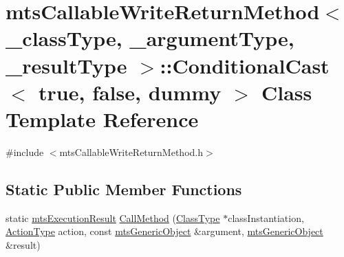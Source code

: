 \hypertarget{classmts_callable_write_return_method_1_1_conditional_cast_3_01true_00_01false_00_01dummy_01_4}{\section{mts\-Callable\-Write\-Return\-Method$<$ \-\_\-class\-Type, \-\_\-argument\-Type, \-\_\-result\-Type $>$\-:\-:Conditional\-Cast$<$ true, false, dummy $>$ Class Template Reference}
\label{classmts_callable_write_return_method_1_1_conditional_cast_3_01true_00_01false_00_01dummy_01_4}
}


{\ttfamily \#include $<$mts\-Callable\-Write\-Return\-Method.\-h$>$}

\subsection*{Static Public Member Functions}
\begin{DoxyCompactItemize}
\item 
static \hyperlink{classmts_execution_result}{mts\-Execution\-Result} \hyperlink{classmts_callable_write_return_method_1_1_conditional_cast_3_01true_00_01false_00_01dummy_01_4_a983b6fc895950636c1d6c2f887d14d80}{Call\-Method} (\hyperlink{classmts_callable_write_return_method_a51dbe6298941ab172d83182c8188092d}{Class\-Type} $\ast$class\-Instantiation, \hyperlink{classmts_callable_write_return_method_a0b5f9726e52abdb0790ccd8c217591b2}{Action\-Type} action, const \hyperlink{classmts_generic_object}{mts\-Generic\-Object} \&argument, \hyperlink{classmts_generic_object}{mts\-Generic\-Object} \&result)
\end{DoxyCompactItemize}


